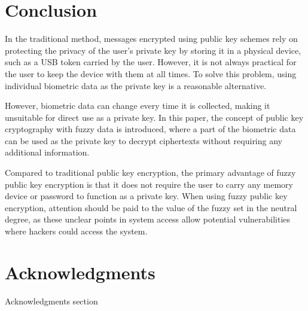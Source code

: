 \documentclass[graybox]{svmult}
\begin{document}
\section{Conclusion}
In the traditional method, messages encrypted using public key schemes rely on protecting the privacy of the user's private key by storing it in a physical device, such as a USB token carried by the user. However, it is not always practical for the user to keep the device with them at all times. To solve this problem, using individual biometric data as the private key is a reasonable alternative.

However, biometric data can change every time it is collected, making it unsuitable for direct use as a private key. In this paper, the concept of public key cryptography with fuzzy data is introduced, where a part of the biometric data can be used as the private key to decrypt ciphertexts without requiring any additional information.

Compared to traditional public key encryption, the primary advantage of fuzzy public key encryption is that it does not require the user to carry any memory device or password to function as a private key. When using fuzzy public key encryption, attention should be paid to the value of the fuzzy set in the neutral degree, as these unclear points in system access allow potential vulnerabilities where hackers could access the system.

\section*{Acknowledgments}
Acknowledgments section


\printbibliography
\end{document}
